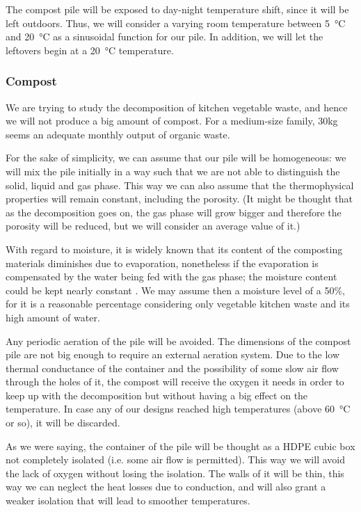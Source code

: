 \documentclass[12pt, a4paper, twocolumn, twoside]{article}
\numberwithin{table}{section}
\numberwithin{figure}{section}
\numberwithin{equation}{section}
\begin{document}
The compost pile will be exposed to day-night temperature shift, since it will be left outdoors. Thus, we will consider a varying room temperature between \SI{5}{\celsius} and \SI{20}{\celsius} as a sinusoidal function for our pile. In addition, we will let the leftovers begin at a \SI{20}{\celsius} temperature.  

\subsubsection{Compost}

We are trying to study the decomposition of kitchen vegetable waste, and hence we will not produce a big amount of compost. For a medium-size family, \si{30}{kg} seems an adequate monthly output of organic waste. 

For the sake of simplicity, we can assume that our pile will be homogeneous: we will mix the pile initially in a way such that we are not able to distinguish the solid, liquid and gas phase. This way we can also assume that the thermophysical properties will remain constant, including the porosity. (It might be thought that as the decomposition goes on, the gas phase will grow bigger and therefore the porosity will be reduced, but we will consider an average value of it.) %

With regard to moisture, it is widely known that its content of the composting materials diminishes due to evaporation, nonetheless if the evaporation is compensated by the water being fed with the gas phase; the moisture content could be kept nearly constant \cite{niceassumptions}. We may assume then a moisture level of a 50\%, for it is a reasonable percentage considering only vegetable kitchen waste and its high amount of water. 

Any periodic aeration of the pile will be avoided. The dimensions of the compost pile are not big enough to require an external aeration system. Due to the low thermal conductance of the container and the possibility of some slow air flow through the holes of it, the compost will receive the oxygen it needs in order to keep up with the decomposition but without having a big effect on the temperature. In case any of our designs reached high temperatures (above \SI{60}{\celsius} or so), it will be discarded. 

As we were saying, the container of the pile will be thought as a HDPE cubic box not completely isolated (i.e. some air flow is permitted). This way we will avoid the lack of oxygen without losing the isolation. The walls of it will be thin, this way we can neglect the heat losses due to conduction, and will also grant a weaker isolation that will lead to smoother temperatures. 
\end{document}
